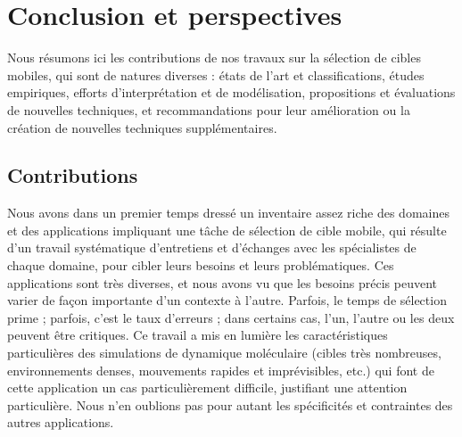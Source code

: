 


\chapter*{Conclusion et perspectives}
\mtcaddchapter %

	Nous résumons ici les contributions de nos travaux sur la sélection de cibles mobiles, qui sont de natures diverses : états de l'art et classifications, études empiriques, efforts d'interprétation et de modélisation, propositions et évaluations de nouvelles techniques, et recommandations pour leur amélioration ou la création de nouvelles techniques supplémentaires.

	\section*{Contributions}
	Nous avons dans un premier temps dressé un inventaire assez riche des domaines et des applications impliquant une tâche de sélection de cible mobile, qui résulte d'un travail systématique d'entretiens et d'échanges avec les spécialistes de chaque domaine, pour cibler leurs besoins et leurs problématiques. Ces applications sont très diverses, et nous avons vu que les besoins précis peuvent varier de façon importante d'un contexte à l'autre. Parfois, le temps de sélection prime ; parfois, c'est le taux d'erreurs ; dans certains cas, l'un, l'autre ou les deux peuvent être critiques. Ce travail a mis en lumière les caractéristiques particulières des simulations de dynamique moléculaire (cibles très nombreuses, environnements denses, mouvements rapides et imprévisibles, etc.) qui font de cette application un cas particulièrement difficile, justifiant une attention particulière. Nous n'en oublions pas pour autant les spécificités et contraintes des autres applications.
	
